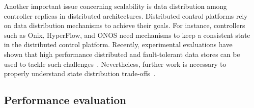 Another important issue concerning scalability is data distribution among controller replicas in distributed architectures.
Distributed control platforms rely on data distribution mechanisms to achieve their goals.
For instance, controllers such as Onix, HyperFlow, and ONOS need mechanisms to keep a consistent state in the distributed control platform.
Recently, experimental evaluations have shown that high performance 
distributed and fault-tolerant data stores can be used to tackle such challenges~\cite{botelho2013}. 
Nevertheless, further work is necessary to properly understand state distribution trade-offs~\cite{levin2012}.

\subsection{Performance evaluation}
\label{sec:performance-eval}

